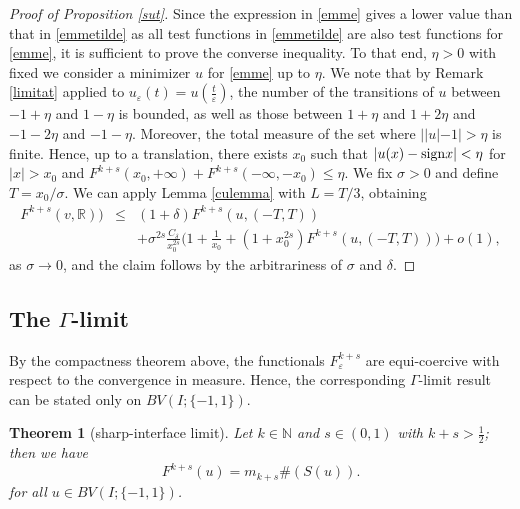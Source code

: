 \documentclass{article}
\newtheorem{theorem}[lemma]{Theorem}
\newcommand{\e}{\varepsilon}
\begin{document}
\begin{proof}[Proof of Proposition \rm\ref{sut}]  Since the expression in \eqref{emme} gives a lower value than that in 
\eqref{emmetilde} as all test functions in \eqref{emmetilde} are also test functions for  \eqref{emme}, it is sufficient to prove the converse inequality. To that end, $\eta>0$ with fixed we consider a minimizer $u$ for \eqref{emme} up to $\eta$. We note that by Remark \ref{limitat} applied to $u_\e(t)=u(\frac{t}\e)$, the number of the transitions of $u$ between $-1+\eta$ and $1-\eta$ is bounded, as well as those between $1+\eta$ and $1+2\eta$ and $-1-2\eta$ and $-1-\eta$. Moreover, the total measure of the set where $||u|-1|>\eta$ is finite. Hence, up to a translation, there exists $x_0$ such that $|u(x)-{\rm sign}x|<\eta$ for $|x|>x_0$ and $F^{k+s}(x_0,+\infty)+F^{k+s}(-\infty,-x_0)\le \eta$.
We fix $\sigma>0$ and define $T=x_0/\sigma$. We can apply Lemma \ref{culemma} with $L=T/3$, obtaining 
\begin{eqnarray*}\label{lemma-co}\nonumber
F^{k+s}(v,\mathbb R))&\le& (1+\delta) F^{k+s}(u,(-T,T))\\ \nonumber
&&+ \sigma^{2s}\frac{C_\delta}{x_0^{2s}}\Big(1+\frac1{x_0}+(1+x_0^{2s})F^{k+s}(u,(-T,T))\Big) +o(1),
\end{eqnarray*}
as $\sigma\to 0$, and the claim follows by the arbitrariness of $\sigma$ and $\delta$.
\end{proof}

\subsection{The $\Gamma$-limit}
By the compactness theorem above, the functionals $F^{k+s}_\e$ are equi-coercive with respect to the convergence in measure. Hence, the corresponding  $\Gamma$-limit result can be stated only on $BV(I;\{-1,1\})$.

\begin{theorem}[sharp-interface limit] Let $k\in \mathbb N$ and $s\in (0,1)$ with $k+s>\frac12$; then
we have 
 \begin{equation}\label{k+s-lim-1}
F^{k+s}(u)= m_{k+s} \#(S(u)).
\end{equation}
for all $u\in BV(I;\{-1,1\})$.
\end{theorem}
\end{document}
